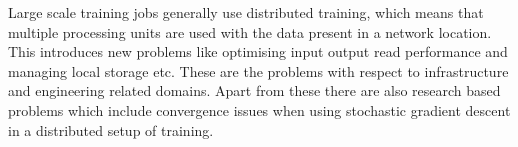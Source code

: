 Large scale training jobs generally use distributed training, which means that multiple processing units are used with the data present in a network location. This introduces new problems like optimising input output read performance and managing local storage etc. These are the problems with respect to infrastructure and engineering related domains. Apart from these there are also research based problems which include convergence issues when using stochastic gradient descent in a distributed setup of training.  




